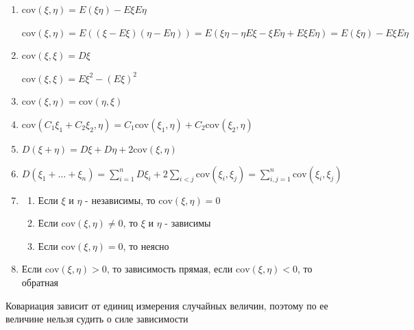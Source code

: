\documentclass[12pt]{article}
\begin{document}
\begin{enumerate}
    \item $\mathrm{cov} (\xi, \eta) = E(\xi\eta) - E\xi E\eta$

    \begin{MyProof}
        $\mathrm{cov}(\xi, \eta) = E((\xi - E\xi)(\eta - E\eta)) = E(\xi\eta - \eta E\xi - \xi E\eta + E\xi E\eta) = E(\xi\eta) - E\xi E\eta$
    \end{MyProof}

    \item $\mathrm{cov} (\xi, \xi) = D\xi$

    \begin{MyProof}
        $\mathrm{cov}(\xi, \xi) = E\xi^2 - (E\xi)^2$
    \end{MyProof}

    \item $\mathrm{cov}(\xi, \eta) = \mathrm{cov}(\eta, \xi)$

    \item $\mathrm{cov}(C_1 \xi_1 + C_2 \xi_2, \eta) = C_1 \mathrm{cov}(\xi_1, \eta) + C_2 \mathrm{cov}(\xi_2, \eta)$

    \item $D(\xi + \eta) = D\xi + D\eta + 2\mathrm{cov}(\xi, \eta)$

    \item $D(\xi_1 + \dots + \xi_n) = \sum_{i = 1}^n D\xi_i + 2\sum_{i < j} \mathrm{cov}(\xi_i, \xi_j) = \sum_{i, j = 1}^{n} \mathrm{cov}(\xi_i, \xi_j)$

    \item \begin{enumerate}
        \item Если $\xi$ и $\eta$ - независимы, то $\mathrm{cov}(\xi, \eta) = 0$

        \item Если $\mathrm{cov}(\xi, \eta) \neq 0$, то $\xi$ и $\eta$ - зависимы

        \item Если $\mathrm{cov}(\xi, \eta) = 0$, то неясно
    \end{enumerate}

    \item Если $\mathrm{cov}(\xi, \eta) > 0$, то зависимость прямая, если $\mathrm{cov}(\xi, \eta) < 0$, то обратная
\end{enumerate}

\Nota Ковариация зависит от единиц измерения случайных величин, поэтому по ее величине нельзя судить о силе зависимости
\end{document}
